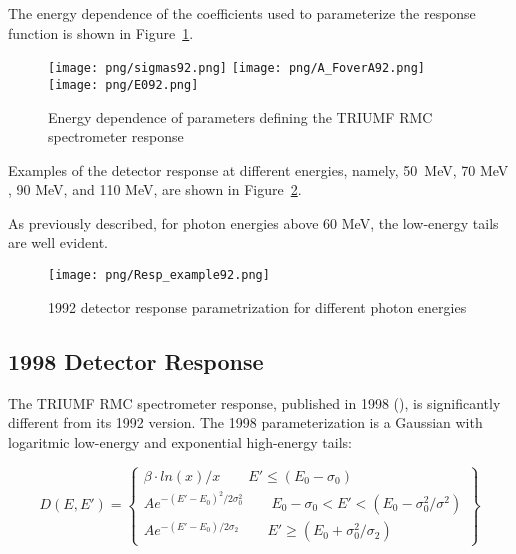 The energy dependence of the coefficients used to parameterize the response
function is shown in Figure~\ref{fig:parameterDependence}.

\begin{figure}[!h]
  \begin{center}
    \texttt{[image: png/sigmas92.png]} 
    \texttt{[image: png/A\_FoverA92.png]} 
    \texttt{[image: png/E092.png]} 
  \end{center}
  \caption{
    Energy dependence of parameters defining the TRIUMF RMC spectrometer response
    \cite{RMC_1992_PhysRevC.46.1094}
  }
  \label{fig:parameterDependence}
\end{figure}

Examples of the detector response at different energies, namely, \mbox{50 MeV},
70 MeV , 90 MeV, and 110 MeV, are shown in Figure~\ref{fig:92ResponseExample}.

As previously described, for photon energies above 60 MeV, the low-energy tails are well evident.

\begin{figure}[!h]
\centering
\texttt{[image: png/Resp\_example92.png]}
\caption{1992 detector response parametrization for different photon energies}
\label{fig:92ResponseExample}
\end{figure}


\subsection { 1998 Detector Response }

The TRIUMF RMC spectrometer response, published in 1998 (\cite{RMC_1998_PhysRevC.58.1767}),
is significantly different from its 1992 version.
The 1998 parameterization is a Gaussian with logaritmic low-energy and exponential
high-energy tails:

\begin{equation}
  D(E,E')= \left\{
    \begin{array}{ll}
      \beta \cdot ln(x)/x    \qquad E' \leq (E_0-\sigma_0) \\
      Ae^{-(E'-E_0)^2/2\sigma_0^2} \qquad E_0-\sigma_0<E'<(E_0-\sigma_0^2/\sigma^2) \\
      Ae^{-(E'-E_0)/2\sigma_2}    \qquad E' \geq (E_0+\sigma_0^2/\sigma_2)
    \end{array}
  \right\}
\end{equation}

